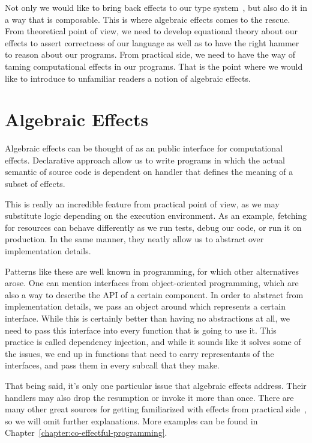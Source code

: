 \documentclass[declaration,shortabstract]{iithesis}
\theoremstyle{definition} \newtheorem{definition}{Definition}[chapter]
\theoremstyle{remark} \newtheorem{remark}[definition]{Observation}
\theoremstyle{plain} \newtheorem{theorem}[definition]{Theorem}
\theoremstyle{plain} \newtheorem{lemma}[definition]{Lemma}
\begin{document}
Not only we would like to bring back effects to our type
system~\cite{type-and-effect}, but also do it in a way that is composable. This
is where algebraic effects comes to the rescue. From theoretical point of view,
we need to develop equational theory about our effects to assert correctness of
our language as well as to have the right hammer to reason about our programs.
From practical side, we need to have the way of taming computational effects
in our programs. That is the point where we would like to introduce to unfamiliar
readers a notion of algebraic effects.

\section{Algebraic Effects}

Algebraic effects can be thought of as an public interface for computational effects.
Declarative approach allow us to write programs in which the actual semantic of
source code is dependent on handler that defines the meaning of a subset of effects.

This is really an incredible feature from practical point of view, as we may substitute
logic depending on the execution environment. As an example, fetching for resources
can behave differently as we run tests, debug our code, or run it on production.
In the same manner, they neatly allow us to abstract over implementation details.

Patterns like these are well known in programming, for which other alternatives
arose. One can mention interfaces from object-oriented programming, which are also
a way to describe the API of a certain component. In order to abstract from
implementation details, we pass an object around which represents a certain
interface. While this is certainly better than having no abstractions at all,
we need to pass this interface into every function that is going to use it.
This practice is called dependency injection, and while it sounds like it solves
some of the issues, we end up in functions that need to carry representants
of the interfaces, and pass them in every subcall that they make.

That being said, it's only one particular issue that algebraic effects address.
Their handlers may also drop the resumption or invoke it more than
once. There are many other great sources for getting familiarized with
effects from practical side~\cite{handlers-tutorial, programming-in-eff, koka-tutorial},
so we will omit further explanations. More examples can be found in
Chapter~\ref{chapter:co-effectful-programming}.
\end{document}
